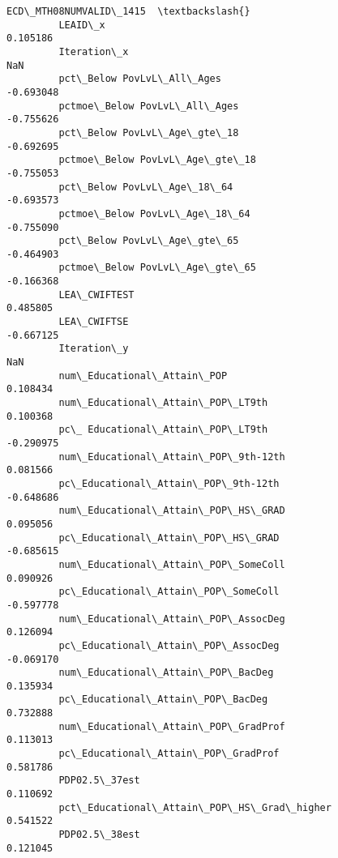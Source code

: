 \documentclass[11pt]{article}
\begin{document}
\begin{Verbatim}[commandchars=\\\{\}]
                                                    ECD\_MTH08NUMVALID\_1415  \textbackslash{}
         LEAID\_x                                                  0.105186   
         Iteration\_x                                                   NaN   
         pct\_Below PovLvL\_All\_Ages                               -0.693048   
         pctmoe\_Below PovLvL\_All\_Ages                            -0.755626   
         pct\_Below PovLvL\_Age\_gte\_18                             -0.692695   
         pctmoe\_Below PovLvL\_Age\_gte\_18                          -0.755053   
         pct\_Below PovLvL\_Age\_18\_64                              -0.693573   
         pctmoe\_Below PovLvL\_Age\_18\_64                           -0.755090   
         pct\_Below PovLvL\_Age\_gte\_65                             -0.464903   
         pctmoe\_Below PovLvL\_Age\_gte\_65                          -0.166368   
         LEA\_CWIFTEST                                             0.485805   
         LEA\_CWIFTSE                                             -0.667125   
         Iteration\_y                                                   NaN   
         num\_Educational\_Attain\_POP                               0.108434   
         num\_Educational\_Attain\_POP\_LT9th                         0.100368   
         pc\_ Educational\_Attain\_POP\_LT9th                        -0.290975   
         num\_Educational\_Attain\_POP\_9th-12th                      0.081566   
         pc\_Educational\_Attain\_POP\_9th-12th                      -0.648686   
         num\_Educational\_Attain\_POP\_HS\_GRAD                       0.095056   
         pc\_Educational\_Attain\_POP\_HS\_GRAD                       -0.685615   
         num\_Educational\_Attain\_POP\_SomeColl                      0.090926   
         pc\_Educational\_Attain\_POP\_SomeColl                      -0.597778   
         num\_Educational\_Attain\_POP\_AssocDeg                      0.126094   
         pc\_Educational\_Attain\_POP\_AssocDeg                      -0.069170   
         num\_Educational\_Attain\_POP\_BacDeg                        0.135934   
         pc\_Educational\_Attain\_POP\_BacDeg                         0.732888   
         num\_Educational\_Attain\_POP\_GradProf                      0.113013   
         pc\_Educational\_Attain\_POP\_GradProf                       0.581786   
         PDP02.5\_37est                                            0.110692   
         pct\_Educational\_Attain\_POP\_HS\_Grad\_higher                0.541522   
         PDP02.5\_38est                                            0.121045   

\end{Verbatim}
\end{document}
